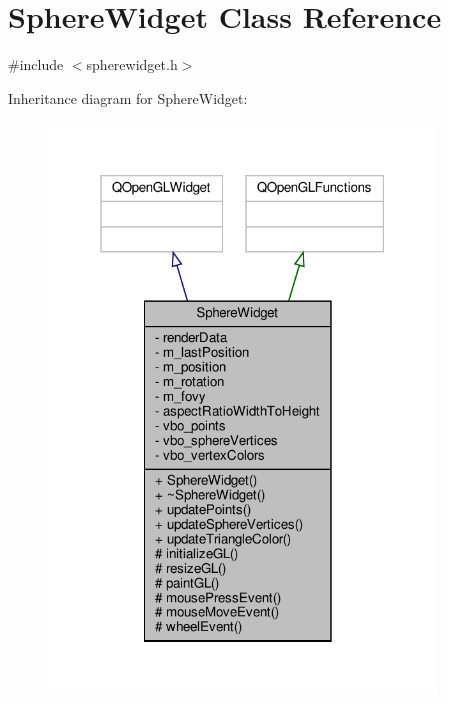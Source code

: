 \hypertarget{class_sphere_widget}{}\section{Sphere\+Widget Class Reference}
\label{class_sphere_widget}


{\ttfamily \#include $<$spherewidget.\+h$>$}



Inheritance diagram for Sphere\+Widget\+:\nopagebreak
\begin{figure}[H]
\begin{center}
\leavevmode
\includegraphics[width=292pt]{d5/de9/class_sphere_widget__inherit__graph}
\end{center}
\end{figure}


